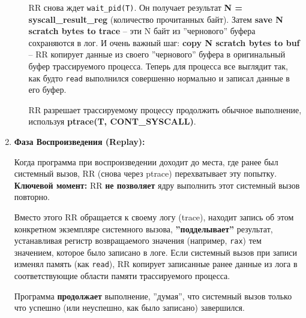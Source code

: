 \begin{enumerate}
\begin{itemize}
      RR снова ждет \texttt{wait\_pid(T)}. Он получает результат \textbf{N =
      syscall\_result\_reg} (количество прочитанных байт). Затем \textbf{save N scratch
      bytes to trace} – эти N байт из ''чернового'' буфера сохраняются в лог. И
      очень важный шаг: \textbf{copy N scratch bytes to buf} – RR копирует данные из
      своего ''чернового'' буфера в оригинальный буфер трассируемого процесса.
      Теперь для процесса все выглядит так, как будто \texttt{read} выполнился
      совершенно нормально и записал данные в его буфер.

      RR разрешает трассируемому процессу продолжить обычное выполнение,
      используя \textbf{ptrace(T, CONT\_SYSCALL)}.

    \end{itemize}

  \item \textbf{Фаза Воспроизведения (Replay):}

  Когда программа при воспроизведении доходит до места, где ранее был системный
  вызов, RR (снова через ptrace) перехватывает эту попытку. \textbf{Ключевой
  момент:} RR \textbf{не позволяет} ядру выполнить этот системный вызов
  повторно. 
  
  Вместо этого RR обращается к своему логу (trace), находит запись об этом
  конкретном экземпляре системного вызова, \textbf{''подделывает''} результат,
  устанавливая регистр возвращаемого значения (например, \texttt{rax}) тем
  значением, которое было записано в логе. Если системный вызов при записи
  изменял память (как \texttt{read}), RR копирует записанные ранее данные из лога в
  соответствующие области памяти трассируемого процесса.

  Программа \textbf{продолжает} выполнение, ''думая'', что системный вызов только что
  успешно (или неуспешно, как было записано) завершился.

\end{enumerate}

